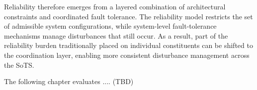 Reliability therefore emerges from a layered combination of architectural constraints and coordinated fault tolerance. The reliability model restricts the set of admissible system configurations, while system-level fault-tolerance mechanisms manage disturbances that still occur. As a result, part of the reliability burden traditionally placed on individual constituents can be shifted to the coordination layer, enabling more consistent disturbance management across the SoTS.

The following chapter evaluates .... (TBD)